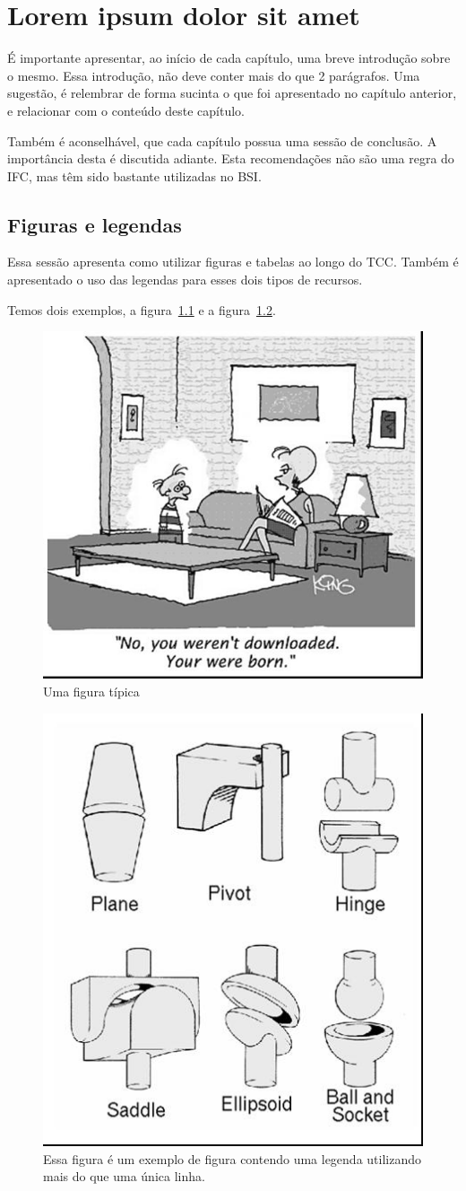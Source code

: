 \chapter{Lorem ipsum dolor sit amet}

É importante apresentar, ao início de cada capítulo, uma breve introdução sobre o mesmo. Essa introdução, não deve conter mais do que 2 parágrafos. Uma sugestão, é relembrar de forma sucinta o que foi apresentado no capítulo anterior, e relacionar com o conteúdo deste capítulo.

Também é aconselhável, que cada capítulo possua uma sessão de conclusão. A importância desta é discutida adiante. Esta recomendações não são uma regra do IFC, mas têm sido bastante utilizadas no BSI. 

\section{Figuras e legendas}\label{sec:figs}

Essa sessão apresenta como utilizar figuras e tabelas ao longo do TCC. Também é apresentado o uso das legendas para esses dois tipos de recursos. 

Temos dois exemplos, a figura~\ref{fig:exemploFig1} e a figura~\ref{fig:exemploFig2}.

\begin{figure}[htbp]
\centering
\includegraphics[width=.5\textwidth]{Figuras/fig1.jpg}
\caption{Uma figura típica}
\label{fig:exemploFig1}
\end{figure}

\begin{figure}[htbp]
\centering
\includegraphics[width=.3\textwidth]{Figuras/fig2.jpg}
\caption{Essa figura é um exemplo de figura contendo uma legenda utilizando mais do que uma única linha.}
\label{fig:exemploFig2}
\end{figure}

